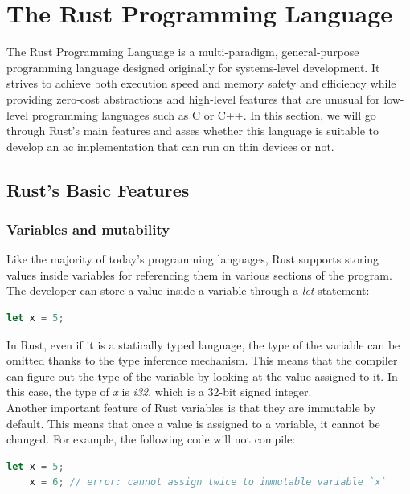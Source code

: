 \section{The Rust Programming Language}
The Rust Programming Language\cite{002} is a multi-paradigm, general-purpose programming language designed originally for systems-level development. It strives to achieve both execution
speed and memory safety and efficiency while providing zero-cost abstractions and high-level features that are unusual for low-level programming languages such as C or C++.
In this section, we will go through Rust's main features and asses whether this language is suitable to develop an \acs{ac} implementation that can run on thin devices or not.

\subsection{Rust's Basic Features}
\subsubsection{Variables and mutability}
Like the majority of today's programming languages, Rust supports storing values inside variables for referencing them in various sections of the program. \\
The developer can store a value inside a variable through a \textit{let} statement:

\begin{lstlisting}[language=Rust]
    let x = 5;
\end{lstlisting}

In Rust, even if it is a statically typed language, the type of the variable can be omitted thanks to the type inference mechanism. This means that the compiler can figure out the type of the variable by looking at the value assigned to it. In this case, the type of \textit{x} is \textit{i32}, which is a 32-bit signed integer. \\

Another important feature of Rust variables is that they are immutable by default. This means that once a value is assigned to a variable, it cannot be changed.
For example, the following code will not compile:

\begin{lstlisting}[language=Rust]
    let x = 5;
    x = 6; // error: cannot assign twice to immutable variable `x`
\end{lstlisting}

